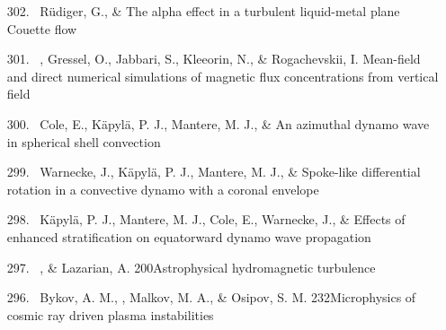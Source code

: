 \begin{itemize}
\item[{302.}~]
R\"udiger, G., \& \Brandenburg{}
{The alpha effect in a turbulent liquid-metal plane Couette flow}

\item[{301.}~]
\Brandenburg, Gressel, O., Jabbari, S., Kleeorin, N., \& Rogachevskii, I.
{Mean-field and direct numerical simulations of magnetic flux concentrations from vertical field}

\item[{300.}~]
Cole, E., K\"apyl\"a, P. J., Mantere, M. J., \& \Brandenburg{}
{An azimuthal dynamo wave in spherical shell convection}

\item[{299.}~]
Warnecke, J., K\"apyl\"a, P. J., Mantere, M. J., \& \Brandenburg{}
{Spoke-like differential rotation in a convective dynamo with a coronal envelope}

\item[{298.}~]
K\"apyl\"a, P. J., Mantere, M. J., Cole, E., Warnecke, J., \& \Brandenburg{}
{Effects of enhanced stratification on equatorward dynamo wave propagation}

\item[{297.}~]
\Brandenburg, \& Lazarian, A.
{200}{Astrophysical hydromagnetic turbulence}

\item[{296.}~]
Bykov, A. M., \Brandenburg, Malkov, M. A., \& Osipov, S. M.
{232}{Microphysics of cosmic ray driven plasma instabilities}


\end{itemize}
